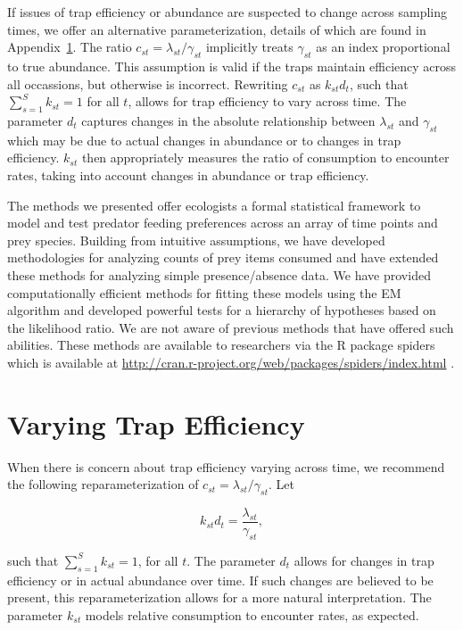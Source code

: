 \documentclass[smallextended]{svjour3}
\begin{document}
If issues of trap efficiency or abundance are suspected to change across sampling times, we offer an alternative parameterization, details of which are found in Appendix~\ref{sec:efficiency}.  The ratio $c_{st} = \lambda_{st} / \gamma_{st}$ implicitly treats $\gamma_{st}$ as an index proportional to true abundance.  This assumption is valid if the traps maintain efficiency across all occassions, but otherwise is incorrect.  Rewriting $c_{st}$ as $k_{st}d_t$, such that $\sum_{s=1}^S k_{st} = 1$ for all $t$, allows for trap efficiency to vary across time.  The parameter $d_t$ captures changes in the absolute relationship between $\lambda_{st}$ and $\gamma_{st}$ which may be due to actual changes in abundance or to changes in trap efficiency.  $k_{st}$ then appropriately measures the ratio of consumption to encounter rates, taking into account changes in abundance or trap efficiency.

The methods we presented offer ecologists a formal statistical framework to model and test predator feeding preferences across an array of time points and prey species. Building from intuitive assumptions, we have developed methodologies for analyzing counts of prey items consumed and have extended these methods for analyzing simple presence/absence data. We have provided computationally efficient methods for fitting these models using the EM algorithm and developed powerful tests for a hierarchy of hypotheses based on the likelihood ratio. We are not aware of previous methods that have offered such abilities. These methods are available to researchers via the R package spiders which is available at \url{http://cran.r-project.org/web/packages/spiders/index.html} \citep{Roualdes:2014}. 

\appendix
\section{Varying Trap Efficiency}
\label{sec:efficiency}

When there is concern about trap efficiency varying across time,  we recommend the following reparameterization of $c_{st} = \lambda_{st}/\gamma_{st}$.  Let

\[ k_{st}d_t = \frac{\lambda_{st}}{\gamma_{st}}, \]

\noindent such that $\sum_{s=1}^S k_{st} = 1$, for all $t$.  The parameter $d_t$ allows for changes in trap efficiency or in actual abundance over time.  If such changes are believed to be present, this reparameterization allows for a more natural interpretation.  The parameter $k_{st}$ models relative consumption to encounter rates, as expected.
\end{document}
